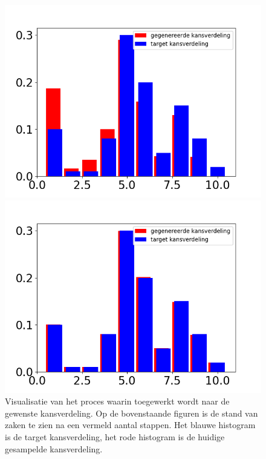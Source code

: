 \begin{figure}
\begin{minipage}{0.49\linewidth}
        \includegraphics[width=\linewidth]{Figures/goede_visualisatie_3/visualisatie_540.png} 
    \end{minipage}
    \hfill
    \begin{minipage}{0.49\linewidth}
        \includegraphics[width=\linewidth]{Figures/goede_visualisatie_3/visualisatie_1000000.png}
    \end{minipage}
\caption{Visualisatie van het proces waarin toegewerkt wordt naar de gewenste kansverdeling. Op de bovenstaande figuren is de stand van zaken te zien na een vermeld aantal stappen. Het blauwe histogram is de target kansverdeling, het rode histogram is de huidige gesampelde kansverdeling.}
\label{fig: visualisatie_metropolis}
\end{figure}

